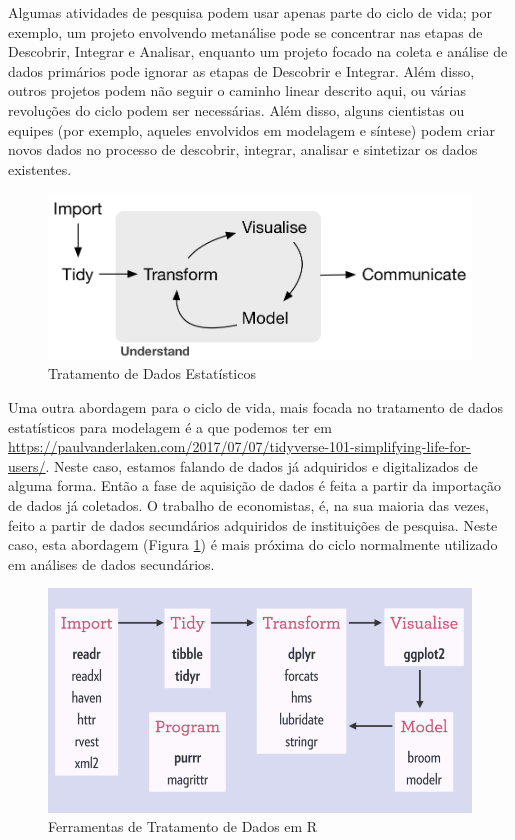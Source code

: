 \documentclass[12pt,a4paper,oneside]{erdc}
\begin{document}
Algumas atividades de pesquisa podem usar apenas parte do ciclo de vida; por exemplo, um projeto envolvendo metanálise pode se concentrar nas etapas de Descobrir, Integrar e Analisar, enquanto um projeto focado na coleta e análise de dados primários pode ignorar as etapas de Descobrir e Integrar. Além disso, outros projetos podem não seguir o caminho linear descrito aqui, ou várias revoluções do ciclo podem ser necessárias. Além disso, alguns cientistas ou equipes (por exemplo, aqueles envolvidos em modelagem e síntese) podem criar novos dados no processo de descobrir, integrar, analisar e sintetizar os dados existentes.


\begin{figure}[htpb]
	\centering
	\includegraphics[width=\linewidth]{../figs/BP_Curso_TecComp_00_2019_f02-02}
	\caption{Tratamento de Dados Estatísticos}
	\label{fig:f02-02}
\end{figure}

Uma outra abordagem para o ciclo de vida, mais focada no tratamento de dados estatísticos para modelagem é a que podemos ter em \url{https://paulvanderlaken.com/2017/07/07/tidyverse-101-simplifying-life-for-users/}. Neste caso, estamos falando de dados já adquiridos e digitalizados de alguma forma. Então a fase de aquisição de dados é feita a partir da importação de dados já coletados. O trabalho de economistas, é, na sua maioria das vezes, feito a partir de dados secundários adquiridos de instituições de pesquisa. Neste caso, esta abordagem (Figura \ref{fig:f02-02}) é mais próxima do ciclo normalmente utilizado em análises de dados secundários.


\begin{figure}[htpb]
	\centering
	\includegraphics[width=0.7\linewidth]{../figs/BP_Curso_TecComp_00_2019_f02-03}
	\caption{Ferramentas de Tratamento de Dados em R}
	\label{fig:f02-03}
\end{figure}
\end{document}
